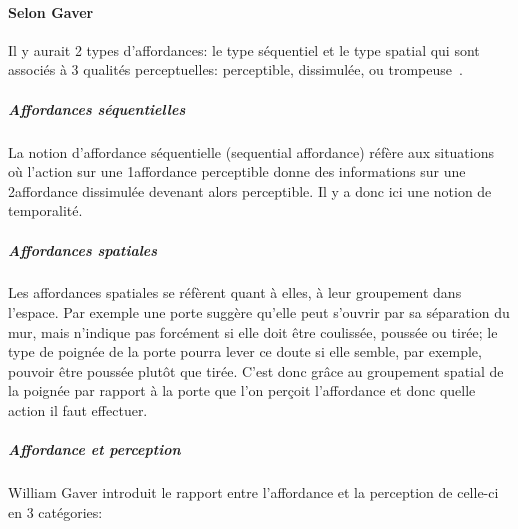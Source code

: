         \paragraph{Selon Gaver}
            Il y aurait 2 types d'affordances: \Li le type séquentiel et \ii le type spatial qui sont associés à 3 qualités perceptuelles: perceptible, dissimulée, ou trompeuse~.
            \subparagraph{Affordances séquentielles}
                La notion d'affordance séquentielle (sequential affordance) réfère aux situations où l'action sur une 1\iere affordance perceptible donne des informations sur une 2\nde affordance dissimulée devenant alors perceptible. Il y a donc ici une notion de temporalité.
            \subparagraph{Affordances spatiales}
                Les affordances spatiales se réfèrent quant à elles, à leur groupement dans l'espace. Par exemple une porte suggère qu'elle peut s'ouvrir par sa séparation du mur, mais n'indique pas forcément si elle doit être coulissée, poussée ou tirée; le type de poignée de la porte pourra lever ce doute si elle semble, par exemple, pouvoir être poussée plutôt que tirée. C'est donc grâce au groupement spatial de la poignée par rapport à la porte que l'on perçoit l'affordance et donc quelle action il faut effectuer.
            \subparagraph{Affordance et perception}
                William Gaver introduit le rapport entre l'affordance et la perception de celle-ci en 3 catégories:
